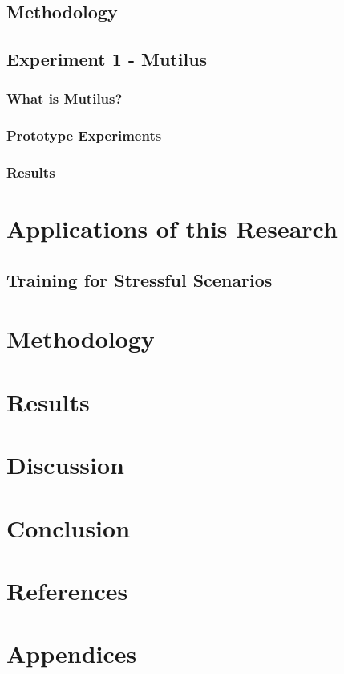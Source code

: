 \documentclass[12pt]{article}
\begin{document}
\subsection{Methodology}

\subsection{Experiment 1 - Mutilus}

\subsubsection{What is Mutilus?}

\subsubsection{Prototype Experiments}



\subsubsection{Results}

\section{Applications of this Research}



\subsection{Training for Stressful Scenarios}

\section{Methodology}

\section{Results}

\section{Discussion}

\section{Conclusion}

\section{References}




\section{Appendices}
\end{document}
